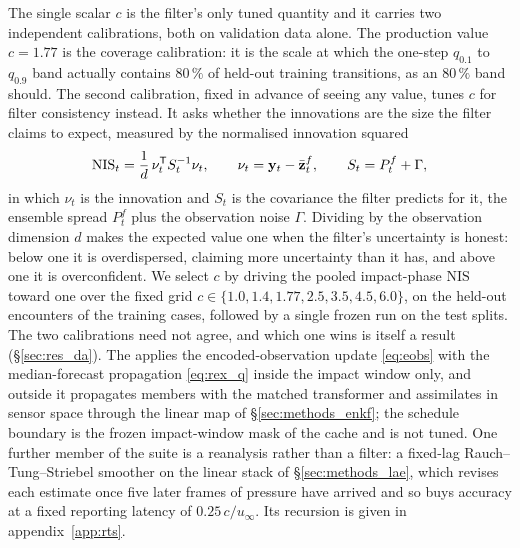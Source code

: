 The single scalar $c$ is the filter's only tuned quantity and it carries two
independent calibrations, both on validation data alone. The production value
$c = 1.77$ is the coverage calibration: it is the scale at which the one-step
$q_{0.1}$ to $q_{0.9}$ band actually contains $80\,\%$ of held-out training
transitions, as an $80\,\%$ band should. The second calibration, fixed in
advance of seeing any value, tunes $c$ for filter consistency instead. It asks
whether the innovations are the size the filter claims to expect, measured by
the normalised innovation squared
\begin{equation}
  \mathrm{NIS}_t = \frac{1}{d}\,\nu_t^{\mathsf{T}} S_t^{-1} \nu_t,
  \qquad \nu_t = \mathbf{y}_t - \bar{\mathbf{z}}^{f}_t,
  \qquad S_t = P^{f}_t + \Gamma,
  \label{eq:nis}
\end{equation}
in which $\nu_t$ is the innovation and $S_t$ is the covariance the filter
predicts for it, the ensemble spread $P^{f}_t$ plus the observation noise
$\Gamma$. Dividing by the observation dimension $d$ makes the expected value one
when the filter's uncertainty is honest: below one it is overdispersed, claiming
more uncertainty than it has, and above one it is overconfident. We select $c$
by driving the pooled impact-phase $\mathrm{NIS}$ toward one over the fixed grid
$c \in \{1.0, 1.4, 1.77, 2.5, 3.5, 4.5, 6.0\}$, on the held-out encounters of
the training cases, followed by a single frozen run on the test splits. The two
calibrations need not agree, and which one wins is itself a result
(\S\ref{sec:res_da}). The \TwoStageKF{} applies the
encoded-observation update \eqref{eq:eobs} with the median-forecast propagation
\eqref{eq:rex_q} inside the impact window only, and outside it propagates
members with the matched transformer and assimilates in sensor space through
the linear map of \S\ref{sec:methods_enkf}; the schedule boundary is the
frozen impact-window mask of the cache and is not tuned. One further member of
the suite is a reanalysis rather than a filter: a fixed-lag
Rauch--Tung--Striebel smoother on the linear stack of \S\ref{sec:methods_lae},
which revises each estimate once five later frames of pressure have arrived and
so buys accuracy at a fixed reporting latency of $0.25\,c/u_\infty$. Its
recursion is given in appendix~\ref{app:rts}.\re


